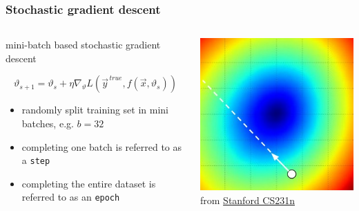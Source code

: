\documentclass[
  aspectratio=1610, %
  intlimits %
]{beamer}
\renewcommand\footnotesize{\tiny}
\begin{document}
 \begin{frame}
   \frametitle{Stochastic gradient descent}
   
\begin{columns}
  \begin{column}{.45\textwidth}
    
    \begin{block}{mini-batch based stochastic gradient descent}

      \begin{equation*}
\vartheta_{s+1} = \vartheta_{s} + \eta \nabla_{\vartheta}L( \vec{y}^{\,true}, f(\vec{x}, \vartheta_{s}))
\end{equation*}

\begin{itemize}
\item randomly split training set in mini batches, e.g. $b=32$
\item completing one batch is referred to as a \texttt{step}
\item completing the entire dataset is referred to as an \texttt{epoch}
\end{itemize}
\end{block}
\end{column}

\begin{column}{.45\textwidth}
  \footnotesize
  \includegraphics[width=\textwidth]{figures/stepsize}\\
  from \href{https://cs231n.github.io/optimization-1/}{Stanford CS231n}
  \end{column}
\end{columns}


\end{frame}
\end{document}
